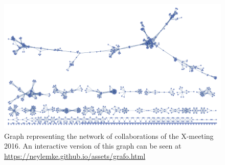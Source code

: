 \begin{landscape}
\begin{figure}[h]
    \begin{center}
  \includegraphics[scale=1.5,angle=0]{grafo}
\end{center}
\caption{Graph representing the network of collaborations of the X-meeting 2016. An interactive 
version of this graph can be seen at \url{https://neylemke.github.io/assets/grafo.html}}
\end{figure}
\end{landscape}
